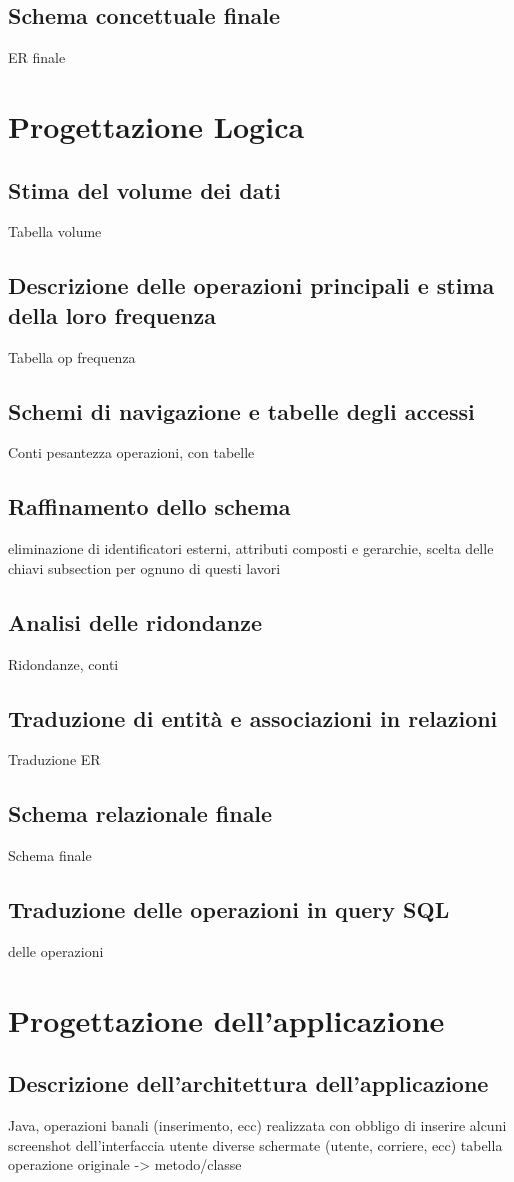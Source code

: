 \documentclass[a4paper,12pt]{report}
\begin{document}
\section{Schema concettuale finale}
ER finale

\chapter{Progettazione Logica}
\section{Stima del volume dei dati}
Tabella volume
\section{Descrizione delle operazioni principali e stima della loro frequenza}
Tabella op frequenza
\section{Schemi di navigazione e tabelle degli accessi}
Conti pesantezza operazioni, con tabelle
\section{Raffinamento dello schema}
eliminazione di identificatori esterni, attributi composti e gerarchie, scelta delle chiavi
subsection per ognuno di questi lavori
\section{Analisi delle ridondanze}
Ridondanze, conti
\section{Traduzione di entità e associazioni in relazioni}
Traduzione ER
\section{Schema relazionale finale}
Schema finale
\section{Traduzione delle operazioni in query SQL}
delle operazioni

\chapter{Progettazione dell'applicazione}
\section{Descrizione dell'architettura dell'applicazione}
Java, operazioni banali (inserimento, ecc)
realizzata con obbligo di inserire alcuni screenshot dell'interfaccia utente
diverse schermate (utente, corriere, ecc)
tabella operazione originale -> metodo/classe
\end{document}
